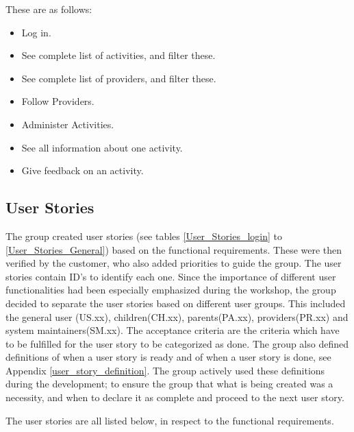 These are as follows:
\begin{itemize}[noitemsep]
    \item Log in.
    \item See complete list of activities, and filter these.
    \item See complete list of providers, and filter these.
    \item Follow Providers. 
    \item Administer Activities.
    \item See all information about one activity.
    \item Give feedback on an activity.
\end{itemize}


\subsection{User Stories}
\label{User stories}
The group created user stories (see tables \ref{User_Stories_login} to \ref{User_Stories_General}) based on the functional requirements. These were then verified by the customer, who also added priorities to guide the group. The user stories contain ID's to identify each one. Since the importance of different user functionalities had been especially emphasized during the workshop, the group decided to separate the user stories based on different user groups. This included the general user (US.xx), children(CH.xx), parents(PA.xx), providers(PR.xx) and system maintainers(SM.xx). The acceptance criteria are the criteria which have to be fulfilled for the user story to be categorized as done. The group also defined definitions of when a user story is ready and of when a user story is done, see Appendix \ref{user_story_definition}. The group actively used these definitions during the development; to ensure the group that what is being created was a necessity, and when to declare it as complete and proceed to the next user story.  

The user stories are all listed below, in respect to the functional requirements. 

